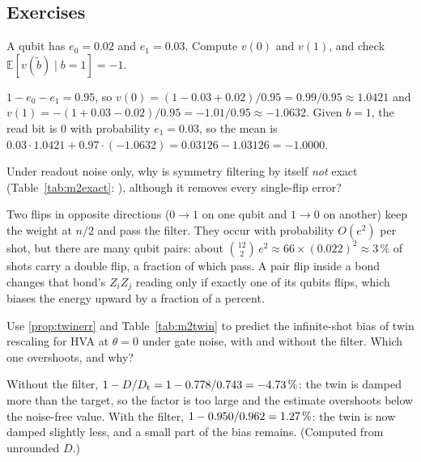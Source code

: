 \subsection*{Exercises}

\begin{exer}
  A qubit has $e_0=0.02$ and $e_1=0.03$. Compute $v(0)$ and $v(1)$, and check
  $\mathbb E[v(\tilde b)\mid b=1]=-1$.
\end{exer}
\begin{sol}
  $1-e_0-e_1=0.95$, so $v(0)=(1-0.03+0.02)/0.95=0.99/0.95\approx1.0421$ and
  $v(1)=-(1+0.03-0.02)/0.95=-1.01/0.95\approx-1.0632$. Given $b=1$, the read bit is $0$ with
  probability $e_1=0.03$, so the mean is $0.03\cdot1.0421+0.97\cdot(-1.0632)=0.03126-1.03126=-1.0000$.
\end{sol}

\begin{exer}
  Under readout noise only, why is symmetry filtering by itself \emph{not} exact
  (Table~\ref{tab:m2exact}: \VMxHvaZeroRoSymRel), although it removes every single-flip error?
\end{exer}
\begin{sol}
  Two flips in opposite directions ($0\to1$ on one qubit and $1\to0$ on another) keep the weight
  at $n/2$ and pass the filter. They occur with probability $O(e^2)$ per shot, but there are
  many qubit pairs: about $\binom{12}{2}\,e^2\approx66\times(0.022)^2\approx3\,\%$ of shots carry
  a double flip, a fraction of which pass. A pair flip inside a bond changes that bond's $Z_iZ_j$
  reading only if exactly one of its qubits flips, which biases the energy upward by a fraction
  of a percent.
\end{sol}

\begin{exer}
  Use \cref{prop:twinerr} and Table~\ref{tab:m2twin} to predict the infinite-shot bias of twin
  rescaling for HVA at $\theta=0$ under gate noise, with and without the filter. Which one
  overshoots, and why?
\end{exer}
\begin{sol}
  Without the filter, $1-D/D_{\mathrm t}=1-0.778/0.743=-4.73\,\%$:
  the twin is damped more than the target, so the factor is too large and the estimate
  overshoots below the noise-free value. With the filter,
  $1-0.950/0.962=1.27\,\%$: the twin is now damped
  slightly less, and a small part of the bias remains. (Computed from unrounded $D$.)
\end{sol}

